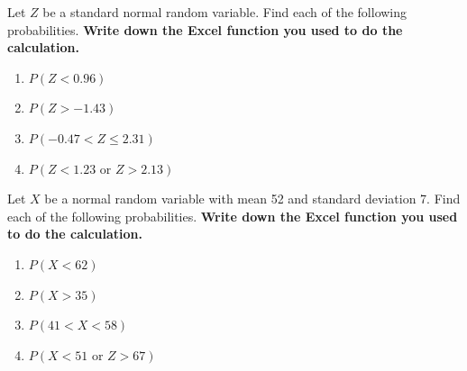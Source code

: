\begin{exercise}
  Let $Z$ be a standard normal random variable. Find each of the following probabilities. \textbf{Write down the Excel function you used to do the calculation.}

  \begin{enumerate}[itemsep=2.5\baselineskip, after=\vspace*{2\baselineskip}]
    \item $P(Z<0.96)$
    \item $P(Z>-1.43)$
    \item $P(-0.47< Z \le 2.31)$
    \item $P(Z<1.23 \text{~or~} Z>2.13)$
  \end{enumerate}
\end{exercise}

\begin{exercise}
  Let $X$ be a normal random variable with mean  52  and standard deviation  7.
  Find each of the following probabilities. \textbf{Write down the Excel function you used to do the calculation.}

  \begin{enumerate}[itemsep=2.5\baselineskip, after=\vspace*{2\baselineskip}]
    \item $P(X<62)$
    \item $P(X> 35)$
    \item $P(41 < X < 58)$
    \item $P(X<51 \text{~or~} Z>67)$
  \end{enumerate}
\end{exercise}


